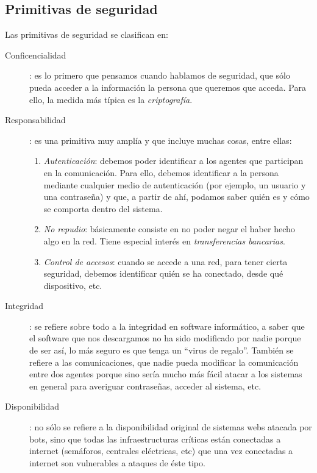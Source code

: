 \documentclass[10pt,a4paper,spanish]{report}
\begin{document}
\subsection{\textcolor{tema2}Primitivas de seguridad}
Las primitivas de seguridad se clasifican en:
\begin{description}
  \item[Conficencialidad]: es lo primero que pensamos cuando hablamos de seguridad, que sólo pueda acceder a la información la persona que queremos que acceda. Para ello, la medida más típica es la \textit{\textcolor{tema2}{criptografía}}.
  \item[Responsabilidad]: es una primitiva muy amplía y que incluye muchas cosas, entre ellas:
  \begin{enumerate}[\color{tema2}{$\bigstar$}]
    \item \textit{\textcolor{tema2}{Autenticación}}: debemos poder identificar a los agentes que participan en la comunicación. Para ello, debemos identificar a la persona mediante cualquier medio de autenticación (por ejemplo, un usuario y una contraseña) y que, a partir de ahí, podamos saber quién es y cómo se comporta dentro del sistema.
    \item \textit{\textcolor{tema2}{No repudio}}: básicamente consiste en no poder negar el haber hecho algo en la red. Tiene especial interés en \textit{\textcolor{tema2}{transferencias bancarias}}.
    \item \textit{\textcolor{tema2}{Control de accesos}}: cuando se accede a una red, para tener cierta seguridad, debemos identificar quién se ha conectado, desde qué dispositivo, etc. %
  \end{enumerate}
  \item[Integridad]: se refiere sobre todo a la integridad en software informático, a saber que el software que nos descargamos no ha sido modificado por nadie porque de ser así, lo más seguro es que tenga un ``virus de regalo''. También se refiere a las comunicaciones, que nadie pueda modificar la comunicación entre dos agentes porque sino sería mucho más fácil atacar a los sistemas en general para averiguar contraseñas, acceder al sistema, etc. 
  \item[Disponibilidad]: no sólo se refiere a la disponibilidad original de sistemas webs atacada por bots, sino que todas las infraestructuras críticas están conectadas a internet (semáforos, centrales eléctricas, etc) que una vez conectadas a internet son vulnerables a ataques de éste tipo.
\end{description}
\end{document}

